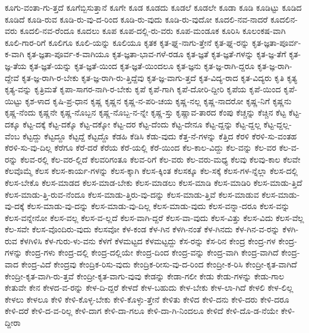 {ಕೂಗು-ವಂತಾ-ಗು-ತ್ತದೆ
ಕೂಗೆಬ್ಬಿಸುತ್ತಾನೆ
ಕೂಗೇ
ಕೂಡ
ಕೂಡದು
ಕೂಡಲೆ
ಕೂಡಲೇ
ಕೂಡಾ
ಕೂಡಿ
ಕೂಡಿಟ್ಟು
ಕೂಡಿದ
ಕೂಡಿದೆ
ಕೂಡಿ-ರುವ
ಕೂಡಿ-ರು-ವು-ದ-ರಿಂದ
ಕೂಡಿ-ರು-ವುದು
ಕೂಡಿ-ರು-ವುದೋ
ಕೂದಲಿ-ನವ-ನಾದರೆ
ಕೂದಲಿನ-ವರು
ಕೂದಲಿ-ನವ-ರೆಂದೂ
ಕೂದಲು
ಕೂಪ
ಕೂಪ-ದಲ್ಲಿ-ರು-ವರು
ಕೂಪ-ಮಂಡೂಕ
ಕೂರಿಸಿ
ಕೂಲಂಕಷ-ವಾಗಿ
ಕೂಲಿ-ಗಾರ-ರಿಗೆ
ಕೂಲಿಗೂ
ಕೂಲಿ-ಯನ್ನು
ಕೂಲಿಯೂ
ಕೃತಕ
ಕೃತ-ಘ್ನ-ನಾಗು-ತ್ತೇನೆ
ಕೃತ-ಘ್ನ-ರನ್ನು
ಕೃತ-ಜ್ಞತಾ-ಪೂರ್ವ-ಕ-ವಾಗಿ
ಕೃತ-ಜ್ಞತಾ-ಪೂರ್ವ-ಕ-ವಾಗಿಯೂ
ಕೃತ-ಜ್ಞತಾ-ಭಾವ-ಗಳೆ-ರಡೂ
ಕೃತ-ಜ್ಞತೆ
ಕೃತ-ಜ್ಞತೆ-ಗಳನ್ನು
ಕೃತ-ಜ್ಞ-ತೆಗೆ
ಕೃತ-ಜ್ಞ-ತೆಯ
ಕೃತ-ಜ್ಞತೆ-ಯನ್ನು
ಕೃತ-ಜ್ಞತೆ-ಯಿಂದ
ಕೃತ-ಜ್ಞತೆ-ಯಿಂದಲೂ
ಕೃತ-ಜ್ಞನು
ಕೃತ-ಜ್ಞ-ರಾಗಿ-ದ್ದರೂ
ಕೃತ-ಜ್ಞ-ರಾಗಿ-ದ್ದೇವೆ
ಕೃತ-ಜ್ಞ-ರಾಗಿ-ರ-ಬೇಕು
ಕೃತ-ಜ್ಞ-ರಾಗಿ-ರು-ತ್ತಿದ್ದೆವು
ಕೃತ-ಜ್ಞ-ವಾಗು-ತ್ತದೆ
ಕೃತ-ವಿದ್ಯ-ರಾದ
ಕೃತ-ವಿದ್ಯರು
ಕೃತಿ
ಕೃತ್ಯ
ಕೃತ್ಯ-ವನ್ನು
ಕೃತ್ರಿಮತೆ
ಕೃಪಾ-ಸಾಗರ-ನಾಗಿ-ರ-ಬೇಕು
ಕೃಪೆ
ಕೃಪೆ-ಗಾಗಿ
ಕೃಪೆ-ದೋರಿ-ದ್ದೀರಿ
ಕೃಪೆಯ
ಕೃಪೆ-ಯಿಂದ
ಕೃಪೆ-ಯಿಟ್ಟು
ಕೃಶ-ಳಾದ
ಕೃಷಿ-ಪ್ರ-ಧಾನ
ಕೃಷ್ಣ
ಕೃಷ್ಣನ
ಕೃಷ್ಣ-ನ-ಪರಿ-ಚಯ
ಕೃಷ್ಣ-ನಲ್ಲ
ಕೃಷ್ಣ-ನಾದರೋ
ಕೃಷ್ಣ-ನಿಗೆ
ಕೃಷ್ಣನು
ಕೃಷ್ಣ-ನೆಂದು
ಕೃಷ್ಣನೇ
ಕೃಷ್ಣ-ನೊಬ್ಬನ
ಕೃಷ್ಣ-ನೊಬ್ಬ-ನ-ನ್ನೇ
ಕೃಷ್ಣ-ಸ್ತು
ಕೃಷ್ಣಾವ-ತಾರದ
ಕೆಂಪು
ಕೆಚ್ಚನ್ನು
ಕೆಚ್ಚಿನ
ಕೆಟ್ಟ
ಕೆಟ್ಟ-ದಕ್ಕೂ
ಕೆಟ್ಟ-ದಕ್ಕೆ
ಕೆಟ್ಟ-ದಕ್ಕೊ
ಕೆಟ್ಟ-ದಕ್ಕೋ
ಕೆಟ್ಟ-ದರ
ಕೆಟ್ಟ-ದೆಂದು
ಕೆಟ್ಟ-ದೇನೂ
ಕೆಟ್ಟ-ದ್ದನ್ನು
ಕೆಟ್ಟ-ದ್ದಲ್ಲ
ಕೆಟ್ಟ-ದ್ದಲ್ಲ-ವೆಂಬ
ಕೆಟ್ಟದ್ದು
ಕೆಟ್ಟದ್ದೂ
ಕೆಟ್ಟದ್ದೆ
ಕೆಟ್ಟದ್ದೊ
ಕೆಡಹಿ
ಕೆಡಿಸಿ
ಕೆಡು-ವುದು
ಕೆತ್ತ-ನೆ-ಗಳನ್ನು
ಕೆತ್ತಿದ
ಕೆರಳಿ
ಕೆರಳಿ-ಸು-ವಂತಹ
ಕೆರಳಿ-ಸು-ವು-ದಿಲ್ಲ
ಕೆರೆಗೂ
ಕೆರೆ-ದರೆ
ಕೆರೆಯ
ಕೆರೆ-ಯಲ್ಲಿ
ಕೆರೆ-ಯಿಂದ
ಕೆಲ-ಕಾಲ-ವಿದ್ದು
ಕೆಲ-ವನ್ನು
ಕೆಲ-ವರ
ಕೆಲ-ವ-ರನ್ನು
ಕೆಲವ-ರಲ್ಲಿ
ಕೆಲ-ವರ-ಲ್ಲಿದೆ
ಕೆಲವರಿಗಂತೂ
ಕೆಲವ-ರಿಗೆ
ಕೆಲ-ವರು
ಕೆಲ-ವರು-ಮಧ್ಯ
ಕೆಲವು
ಕೆಲವು-ಕಾಲ
ಕೆಲವೇ
ಕೆಲವೊಮ್ಮೆ
ಕೆಲಸ
ಕೆಲಸ-ಕಾರ್ಯ-ಗಳನ್ನು
ಕೆಲಸ-ಕ್ಕಾಗಿ
ಕೆಲಸ-ಕ್ಕಿಂತ
ಕೆಲಸಕ್ಕೂ
ಕೆಲ-ಸಕ್ಕೆ
ಕೆಲಸ-ಗಳ-ನ್ನೆಲ್ಲಾ
ಕೆಲಸ-ದಲ್ಲಿ
ಕೆಲಸ-ಬೇಕೊ
ಕೆಲಸ-ಮಾಡದ
ಕೆಲಸ-ಮಾಡ-ಬೇಕು
ಕೆಲಸ-ಮಾಡಲು
ಕೆಲಸ-ಮಾಡಿ
ಕೆಲಸ-ಮಾಡಿರಿ
ಕೆಲಸ-ಮಾಡು-ತ್ತಿದೆ
ಕೆಲಸ-ಮಾಡು-ತ್ತಿ-ರುವ-ನೆಂದೂ
ಕೆಲಸ-ಮಾಡು-ತ್ತಿರು-ವು-ದನ್ನು
ಕೆಲಸ-ಮಾಡು-ತ್ತಿವೆ
ಕೆಲಸ-ಮಾಡುವ
ಕೆಲಸ-ಮಾಡು-ವು-ದಕ್ಕೆ
ಕೆಲಸ-ಮಾಡು-ವು-ದನ್ನು
ಕೆಲಸ-ಮಾಡು-ವು-ದಿಲ್ಲ
ಕೆಲಸ-ಮಾಡು-ವುದು
ಕೆಲಸ-ವನ್ನಾ-ದರೂ
ಕೆಲಸ-ವನ್ನು
ಕೆಲಸ-ವನ್ನೇನೋ
ಕೆಲಸ-ವಲ್ಲ
ಕೆಲಸ-ವ-ಲ್ಲದೆ
ಕೆಲಸ-ವಾಗಿ-ದ್ದರೆ
ಕೆಲಸ-ವಾ-ವುದು
ಕೆಲಸ-ವಿತ್ತು
ಕೆಲಸ-ವಿದು
ಕೆಲಸ-ವೆಲ್ಲ
ಕೆಲ-ಸವೇ
ಕೆಲಸ-ವೊಂದಿರು-ವುದು
ಕೆಲಸವೋ
ಕೆಳ-ಕಂಡ
ಕೆಳ-ಗಿನ
ಕೆಳಗಿ-ನಂತೆ
ಕೆಳ-ಗಿನದು
ಕೆಳ-ಗಿನ-ವ-ರನ್ನು
ಕೆಳಗಿ-ರುವ
ಕೆಳಗಿಳಿಸಿ
ಕೆಳ-ಗುರು-ಳು-ವನು
ಕೆಳಗೆ
ಕೆಳಮಟ್ಟದ
ಕೆಳಮಟ್ಟದ್ದು
ಕೆಸ-ರನ್ನು
ಕೆಸ-ರಿನ
ಕೇಂದ್ರ
ಕೇಂದ್ರ-ಗಳ
ಕೇಂದ್ರ-ಗಳನ್ನು
ಕೇಂದ್ರ-ಗಳು
ಕೇಂದ್ರ-ದಲ್ಲಿ
ಕೇಂದ್ರ-ದಲ್ಲಿಯೇ
ಕೇಂದ್ರ-ದಿಂದ
ಕೇಂದ್ರ-ವನ್ನು
ಕೇಂದ್ರ-ವಾಗಿ
ಕೇಂದ್ರ-ವಾಗಿದೆ
ಕೇಂದ್ರ-ವಾದ
ಕೇಂದ್ರ-ವಿದೆ
ಕೇಂದ್ರವು
ಕೇಂದ್ರಿಕ-ರಿಸು-ವುದು
ಕೇಂದ್ರಿಕ-ರೀಸು-ವು-ದ-ರಿಂದ
ಕೇಂದ್ರೀ-ಕ-ರಿಸಿ
ಕೇಂದ್ರೀ-ಕೃತ-ವಾಗಿದೆ
ಕೇಂದ್ರೀ-ಕೃತ-ವಾಗಿ-ರು-ತ್ತವೆ
ಕೇಂದ್ರೀ-ಕೃತ-ವಾಗು-ವುವು
ಕೇಡನ್ನು
ಕೇಡಾ-ಗಲೀ
ಕೇಡು
ಕೇಡು-ಗಳನ್ನು
ಕೇಡು-ಗಾಲ
ಕೇತುವೇ
ಕೇನ
ಕೇಳದ-ವ-ರನ್ನು
ಕೇಳ-ದಿ-ದ್ದರೆ
ಕೇಳದೆ
ಕೇಳ-ಬಹುದು
ಕೇಳ-ಬೇಕು
ಕೇಳ-ಲಾ-ಗಿದೆ
ಕೇಳಲಿ
ಕೇಳ-ಲಿಲ್ಲ
ಕೇಳಲು
ಕೇಳಲೂ
ಕೇಳಿ
ಕೇಳಿ-ಕೊಳ್ಳ-ಬೇಕು
ಕೇಳಿ-ಕೊಳ್ಳು-ತ್ತೇನೆ
ಕೇಳಿತು
ಕೇಳಿದ
ಕೇಳಿ-ದನು
ಕೇಳಿ-ದರು
ಕೇಳಿ-ದರೂ
ಕೇಳಿ-ದರೆ
ಕೇಳಿ-ದ-ವ-ರಿಲ್ಲ
ಕೇಳಿ-ದಾಗ
ಕೇಳಿ-ದಾ-ಗಲೂ
ಕೇಳಿ-ದಾ-ಗಿ-ನಿಂದಲೂ
ಕೇಳಿದೆ
ಕೇಳಿ-ದೊ-ಡ-ನೆಯೇ
ಕೇಳಿ-ದ್ದೀರಾ
}
